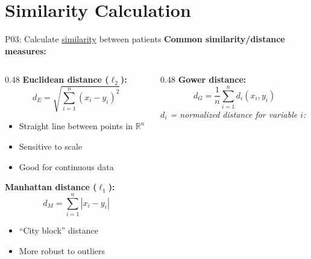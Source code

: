 \documentclass[aspectratio=169, 10pt]{beamer}
\begin{document}
\section{Similarity Calculation}

\begin{frame}{P03: Calculate \href{https://en.wikipedia.org/wiki/Similarity_measure}{similarity} between patients}
    \textbf{Common similarity/distance measures:}
    \vspace{-1mm}
    \begin{columns}[T]
        \begin{column}{0.48\textwidth}
            \textbf{Euclidean distance ($\ell_2$):}
            \vspace{-2mm}
            \[
            d_E = \sqrt{\sum_{i=1}^{n}(x_i - y_i)^2}
            \]
            \vspace{-3mm}
            \footnotesize
            \begin{itemize}\setlength{\itemsep}{0pt}
                \item Straight line between points in $\mathbb{R}^n$
                \item Sensitive to scale
                \item Good for continuous data
            \end{itemize}
            \normalsize
            
            \textbf{Manhattan distance ($\ell_1$):}
            \vspace{-2mm}
            \[
            d_M = \sum_{i=1}^{n}|x_i - y_i|
            \]
            \vspace{-3mm}
            \footnotesize
            \begin{itemize}\setlength{\itemsep}{0pt}
                \item ``City block'' distance
                \item More robust to outliers
            \end{itemize}
        \end{column}
        \begin{column}{0.48\textwidth}
            \textbf{Gower distance:}
            \vspace{-2mm}
            \[
            d_G = \frac{1}{n}\sum_{i=1}^{n}d_i(x_i, y_i)
            \]
            \vspace{-1mm}
            \scriptsize
            \textit{$d_i$ = normalized distance for variable $i$:}
            

\end{column}
\end{columns}
\end{frame}
\end{document}
